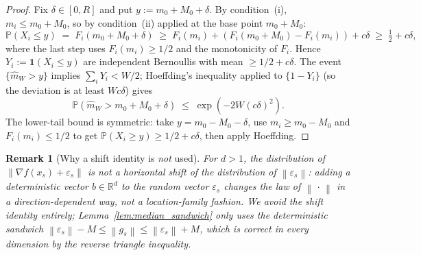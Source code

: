\documentclass[11pt]{article}
\newtheorem{remark}[theorem]{Remark}
\theoremstyle{definition}
\newcommand{\R}{\mathbb{R}}
\newcommand{\Prob}{\mathbb{P}}
\newcommand{\norm}[1]{\left\| #1 \right\|}
\begin{document}
\begin{proof}
Fix $\delta \in [0, R]$ and put $y := m_0 + M_0 + \delta$. By condition~(i),
$m_i \leq m_0 + M_0$, so by condition~(ii) applied at the base point
$m_0 + M_0$:
\[
  \Prob(X_i \leq y)
  \;=\; F_i(m_0 + M_0 + \delta)
  \;\geq\; F_i(m_i) + (F_i(m_0 + M_0) - F_i(m_i)) + c\delta
  \;\geq\; \tfrac{1}{2} + c\delta,
\]
where the last step uses $F_i(m_i) \geq 1/2$ and the monotonicity of $F_i$.
Hence $Y_i := \mathbf 1(X_i \leq y)$ are independent Bernoullis with mean
$\geq 1/2 + c\delta$. The event $\{\hat m_W > y\}$ implies $\sum_i Y_i < W/2$;
Hoeffding's inequality applied to $\{1 - Y_i\}$ (so the deviation is at least
$Wc\delta$) gives
\[
  \Prob(\hat m_W > m_0 + M_0 + \delta)
  \;\leq\; \exp(-2W(c\delta)^2).
\]
The lower-tail bound is symmetric: take $y = m_0 - M_0 - \delta$, use
$m_i \geq m_0 - M_0$ and $F_i(m_i) \leq 1/2$ to get
$\Prob(X_i \geq y) \geq 1/2 + c\delta$, then apply Hoeffding.
\end{proof}

\begin{remark}[Why a shift identity is \emph{not} used]\label{rem:no_shift}
For $d > 1$, the distribution of $\norm{\nabla f(x_s) + \varepsilon_s}$ is
\emph{not} a horizontal shift of the distribution of $\norm{\varepsilon_s}$:
adding a deterministic vector $b\in\R^d$ to the random vector $\varepsilon_s$
changes the law of $\norm{\,\cdot\,}$ in a direction-dependent way, not a
location-family fashion. We avoid the shift identity entirely;
Lemma~\ref{lem:median_sandwich} only uses the deterministic sandwich
$\norm{\varepsilon_s}-M\leq\norm{g_s}\leq\norm{\varepsilon_s}+M$, which is
correct in every dimension by the reverse triangle inequality.
\end{remark}
\end{document}
